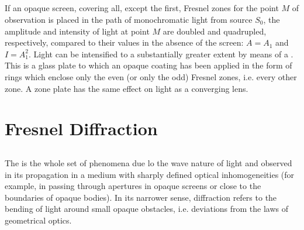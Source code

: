 \subsection{}\label{33.1.5} If an opaque screen, covering all, except the first, Fresnel zones for the point $M$ of observation is placed in the path of monochromatic light from source $S_{0}$, the amplitude and intensity of light at point $M$ are doubled and quadrupled, respectively, compared to their values in the absence of the screen: $A = A_{1}$
and $I = A_{1}^{2}$. Light can be intensified to a substantially greater extent by means of a . This is a glass plate to which an opaque coating has been applied in the form of rings which enclose only the even (or only the odd) Fresnel zones, i.e. every other zone. A zone plate has the same effect on light as a converging lens.

\section{Fresnel Diffraction}
\label{sec-33.2} 


\subsection{}\label{33.2.1} The  is the whole set of phenomena due lo the wave nature of light and observed in its propagation in a medium with sharply defined optical inhomogeneities (for example, in passing through apertures in opaque screens or close to the boundaries of opaque bodies). In its narrower sense, diffraction refers to the bending of light around small opaque obstacles, i.e. deviations from the laws of geometrical optics.

